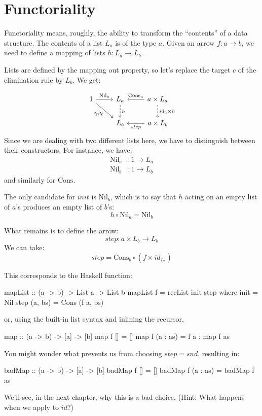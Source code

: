 \documentclass[DaoFP]{subfiles}
\begin{document}
\section{Functoriality}

Functoriality means, roughly, the ability to transform the ``contents'' of a data structure. The contents of a list $L_a$ is of the type $a$. Given an arrow $f \colon a \to b$, we need to define a mapping of lists $h \colon L_a \to L_b$.

Lists are defined by the mapping out property, so let's replace the target $c$ of the elimination rule by $L_b$. We get:

\[
 \begin{tikzcd}
 1
 \arrow[r, "\text{Nil}_a"]
 \arrow[rd, "\mathit{init}"']
 &L_a
\arrow[d, dashed, "h"]
&a \times L_a
  \arrow[l, "\text{Cons}_a"']
\arrow[d, dashed, "id_a \times h"]
\\
& L_b
& a \times L_b
\arrow[l, "\mathit{step}"]
  \end{tikzcd}
\]
Since we are dealing with two different lists here, we have to distinguish between their constructors. For instance, we have: 
\begin{align*}
\text{Nil}_a &\colon 1 \to L_a \\
\text{Nil}_b &\colon 1 \to L_b 
\end{align*}
and similarly for $\text{Cons}$.

The only candidate for $\mathit{init}$ is $\text{Nil}_b$, which is to say that $h$ acting on an empty list of $a$'s produces an empty list of $b$'s:
\[ h \circ \text{Nil}_a = \text{Nil}_b \]

What remains is to define the arrow:
\[\mathit{step} \colon a \times L_b \to L_b\]
We can take:
\[ \mathit{step} = \text{Cons}_b \circ (f \times id_{L_b}) \]

This corresponds to the Haskell function:

\begin{haskell}
mapList :: (a -> b) -> List a -> List b
mapList f = recList init step
  where
    init = Nil
    step (a, bs) = Cons (f a, bs)
\end{haskell}
or, using the built-in list syntax and inlining the recursor,
\begin{haskell}
map :: (a -> b) -> [a] -> [b]
map f [] = []
map f (a : as) = f a : map f as
\end{haskell}

You might wonder what prevents us from choosing $\mathit{step} = \mathit{snd}$, resulting in:
\begin{haskell}
badMap :: (a -> b) -> [a] -> [b]
badMap f [] = []
badMap f (a : as) = badMap f as
\end{haskell}
We'll see, in the next chapter, why this is a bad choice. (Hint: What happens when we apply  to $id$?)
\end{document}
